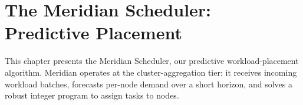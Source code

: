 \chapter{The Meridian Scheduler: Predictive Placement}
\label{ch:placement}

This chapter presents the Meridian Scheduler, our predictive workload-placement
algorithm. Meridian operates at the cluster-aggregation tier: it receives
incoming workload batches, forecasts per-node demand over a short horizon, and
solves a robust integer program to assign tasks to nodes.
